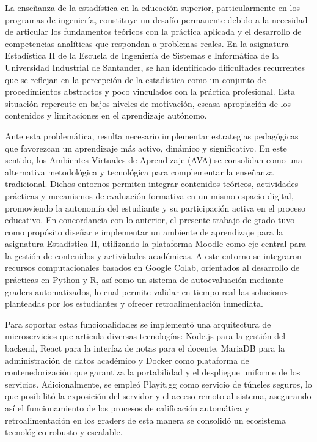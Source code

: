 \documentclass[letter,oneside,12pt,spanish]{report}
\begin{document}

\newpage


La enseñanza de la estadística en la educación superior, particularmente en los programas de ingeniería, constituye un desafío permanente debido a la necesidad de articular los fundamentos teóricos con la práctica aplicada y el desarrollo de competencias analíticas que respondan a problemas reales. En la asignatura Estadística II de la Escuela de Ingeniería de Sistemas e Informática de la Universidad Industrial de Santander, se han identificado dificultades recurrentes que se reflejan en la percepción de la estadística como un conjunto de procedimientos abstractos y poco vinculados con la práctica profesional. Esta situación repercute en bajos niveles de motivación, escasa apropiación de los contenidos y limitaciones en el aprendizaje autónomo.

Ante esta problemática, resulta necesario implementar estrategias pedagógicas que favorezcan un aprendizaje más activo, dinámico y significativo. En este sentido, los Ambientes Virtuales de Aprendizaje (AVA) se consolidan como una alternativa metodológica y tecnológica para complementar la enseñanza tradicional. Dichos entornos permiten integrar contenidos teóricos, actividades prácticas y mecanismos de evaluación formativa en un mismo espacio digital, promoviendo la autonomía del estudiante y su participación activa en el proceso educativo.
En concordancia con lo anterior, el presente trabajo de grado tuvo como propósito diseñar e implementar un ambiente de aprendizaje para la asignatura Estadística II, utilizando la plataforma Moodle como eje central para la gestión de contenidos y actividades académicas. A este entorno se integraron recursos computacionales basados en Google Colab, orientados al desarrollo de prácticas en Python y R, así como un sistema de autoevaluación mediante graders automatizados, lo cual permite validar en tiempo real las soluciones planteadas por los estudiantes y ofrecer retroalimentación inmediata.

Para soportar estas funcionalidades se implementó una arquitectura de microservicios que articula diversas tecnologías: Node.js para la gestión del backend, React para la interfaz de notas para el docente, MariaDB para la administración de datos académico y Docker como plataforma de contenedorización que garantiza la portabilidad y el despliegue uniforme de los servicios. Adicionalmente, se empleó Playit.gg como servicio de túneles seguros, lo que posibilitó la exposición del servidor y el acceso remoto al sistema, asegurando así el funcionamiento de los procesos de calificación automática y retroalimentación en los graders de esta manera se consolidó un ecosistema tecnológico robusto y escalable.
\end{document}
